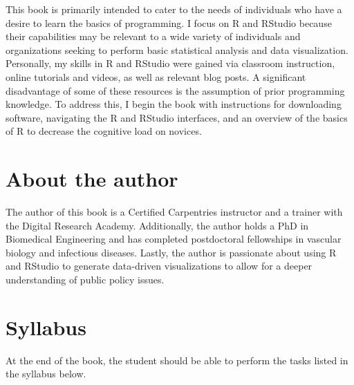 \documentclass[
  letterpaper,
  DIV=11,
  numbers=noendperiod]{scrreprt}
\begin{document}

This book is primarily intended to cater to the needs of individuals who
have a desire to learn the basics of programming. I focus on R and
RStudio because their capabilities may be relevant to a wide variety of
individuals and organizations seeking to perform basic statistical
analysis and data visualization. Personally, my skills in R and RStudio
were gained via classroom instruction, online tutorials and videos, as
well as relevant blog posts. A significant disadvantage of some of these
resources is the assumption of prior programming knowledge. To address
this, I begin the book with instructions for downloading software,
navigating the R and RStudio interfaces, and an overview of the basics
of R to decrease the cognitive load on novices.

\section*{About the author}\label{about-the-author}


The author of this book is a Certified Carpentries instructor and a
trainer with the Digital Research Academy. Additionally, the author
holds a PhD in Biomedical Engineering and has completed postdoctoral
fellowships in vascular biology and infectious diseases. Lastly, the
author is passionate about using R and RStudio to generate data-driven
visualizations to allow for a deeper understanding of public policy
issues.

\section*{Syllabus}\label{syllabus}


At the end of the book, the student should be able to perform the tasks
listed in the syllabus below.
\end{document}
